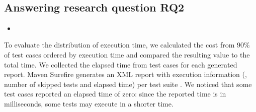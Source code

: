 \begin{figure}[h!]%
    \centering
    \begin{minipage}{0.5\textwidth}
        \\
    \end{minipage}%
    \caption{}%
    \label{fig:scatters}%
\end{figure}

\subsection{Answering research question RQ2}
\label{sec:rqTwo}

\begin{itemize}
    \item \RQC
\end{itemize}

To evaluate the distribution of execution time, we calculated the cost
from 90\% of test cases ordered by execution time and compared the
resulting value to the total time.  We collected the elapsed time from
test cases for each generated report. Maven Surefire generates an XML
report with execution information (\eg, number of skipped tests and
elapsed time) per test suite . We noticed that some test cases
reported an elapsed time of zero: since the reported time is in
milliseconds, some tests may execute in a shorter time. 

